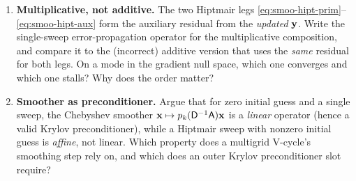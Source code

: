 \begin{enumerate}[nosep]
  \item \textbf{Multiplicative, not additive.} The two Hiptmair legs
  \cref{eq:smoo-hipt-prim}--\cref{eq:smoo-hipt-aux} form the auxiliary residual from
  the \emph{updated} $\mathbf{y}$. Write the single-sweep error-propagation operator for
  the multiplicative composition, and compare it to the (incorrect) additive version
  that uses the \emph{same} residual for both legs. On a mode in the gradient null
  space, which one converges and which one stalls? Why does the order matter?

  \item \textbf{Smoother as preconditioner.} Argue that for zero initial guess and a
  single sweep, the Chebyshev smoother $\mathbf{x}\mapsto p_k(\mathsf{D}^{-1}\mathsf{A})\mathbf{x}$ is a
  \emph{linear} operator (hence a valid Krylov preconditioner), while a Hiptmair
  sweep with nonzero initial guess is \emph{affine}, not linear. Which property does
  a multigrid V-cycle's smoothing step rely on, and which does an outer Krylov
  preconditioner slot require?
\end{enumerate}
